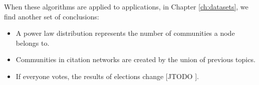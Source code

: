 \documentclass[phd,tocprelim]{cornell}
\begin{document}
When these algorithms are applied to applications, in Chapter \ref{ch:datasets}, we find another set of conclusions:
\begin{itemize}
\item A power law distribution represents the number of communities a node belongs to.
\item Communities in citation networks are created by the union of previous topics.
\item If everyone votes, the results of elections change [JTODO ].
\end{itemize}




\end{document}
